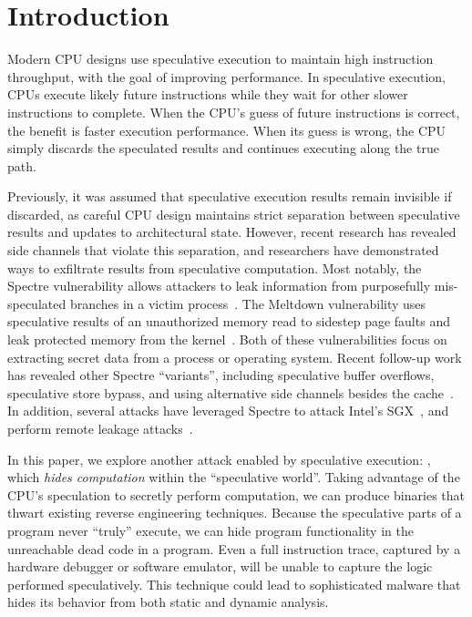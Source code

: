 
\section{Introduction}


Modern CPU designs use speculative execution to maintain high instruction
throughput, with the goal of improving performance. In speculative execution,
CPUs execute likely future instructions while they wait for other slower
instructions to complete. When the CPU's guess of future instructions is correct, the
benefit is faster execution performance. When its guess is wrong, the CPU
simply discards the speculated results and continues executing along the true path.


Previously, it was assumed that speculative execution results remain invisible
if discarded, as careful CPU design maintains strict separation between
speculative results and updates to architectural state. However, recent research
has revealed side channels that violate this separation, and researchers have
demonstrated ways to exfiltrate results from speculative computation. Most
notably, the Spectre vulnerability allows attackers to leak information from
purposefully mis-speculated branches in a victim process~\cite{spectre}. The
Meltdown vulnerability uses speculative results of an unauthorized memory read
to sidestep page faults and leak protected memory from the
kernel~\cite{meltdown}. Both of these vulnerabilities focus on extracting secret
data from a process or operating system. Recent follow-up work has revealed
other Spectre ``variants'',  including speculative buffer overflows, speculative
store bypass, and using alternative side channels besides the
cache~\cite{kiriansky2018speculative, spectre_ng}. In addition, several attacks
have leveraged Spectre to attack Intel's SGX~\cite{chen2018sgxpectre,
spectre_sgx, foreshadow}, and perform remote leakage
attacks~\cite{schwarz2018netspectre}.

\medskip

In this paper, we explore another attack enabled by speculative execution:
\speculake, which \emph{hides computation} within
the ``speculative world''. Taking advantage of the CPU's speculation to secretly
perform computation,
we can produce binaries that thwart existing reverse engineering
techniques. Because the speculative parts of a program never ``truly'' execute,
we can hide program functionality in the unreachable dead code in a program.
Even a full instruction trace, captured by a hardware debugger or software
emulator, will be unable to capture the logic performed speculatively.
This technique could lead to sophisticated malware that hides its behavior
from both static and dynamic analysis.


